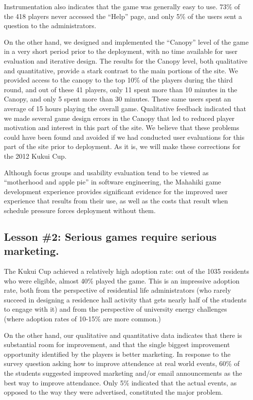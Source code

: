 \documentclass{acm_proc_article-sp}
\begin{document}
Instrumentation also indicates that the game was generally easy to
use. 73\% of the 418 players never accessed the ``Help'' page, and only 5\%
of the users sent a question to the administrators. 

On the other hand, we designed and implemented the ``Canopy'' level of the
game in a very short period prior to the deployment, with no time available
for user evaluation and iterative design.  The results for the Canopy
level, both qualitative and quantitative, provide a stark contrast to the
main portions of the site.  We provided access to the canopy to the top
10\% of the players during the third round, and out of these 41 players,
only 11 spent more than 10 minutes in the Canopy, and only 5 spent more
than 30 minutes. These same users spent an average of 15 hours playing the
overall game.  Qualitative feedback indicated that we made several game
design errors in the Canopy that led to reduced player motivation and
interest in this part of the site.  We believe that these problems could
have been found and avoided if we had conducted user evaluations for this
part of the site prior to deployment.  As it is, we will make these
corrections for the 2012 Kukui Cup.

Although focus groups and usability evaluation tend to be viewed as
``motherhood and apple pie'' in software engineering, the Mahahiki game
development experience provides significant evidence for the improved user
experience that results from their use, as well as the costs that result
when schedule pressure forces deployment without them.

\subsection{Lesson \#2: Serious games require serious marketing.}

The Kukui Cup achieved a relatively high adoption rate: out of the 1035
residents who were eligible, almost 40\% played the game.  This is an
impressive adoption rate, both from the perspective of residential life
administrators (who rarely succeed in designing a residence hall activity
that gets nearly half of the students to engage with it) and from the
perspective of university energy challenges (where adoption rates of
10-15\% are more common.)  

On the other hand, our qualitative and quantitative data indicates that
there is substantial room for improvement, and that the single biggest
improvement opportunity identified by the players is better marketing.  In
response to the survey question asking how to improve attendence at real
world events, 60\% of the students suggested improved marketing and/or email
announcements as the best way to improve attendance.  Only 5\% indicated
that the actual events, as opposed to the way they were advertised,
constituted the major problem.
\end{document}
